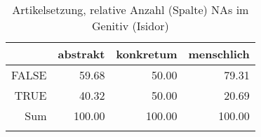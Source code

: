 \begin{table}[ht]
\centering
\begin{tabular}{rrrr}
  \lsptoprule
 & abstrakt & konkretum & menschlich \\ 
  \midrule
FALSE & 59.68 & 50.00 & 79.31 \\ 
  TRUE & 40.32 & 50.00 & 20.69 \\ 
  Sum & 100.00 & 100.00 & 100.00 \\ 
   \lspbottomrule
\end{tabular}
\caption{Artikelsetzung, relative Anzahl (Spalte) NAs im Genitiv (Isidor)} 
\end{table}
